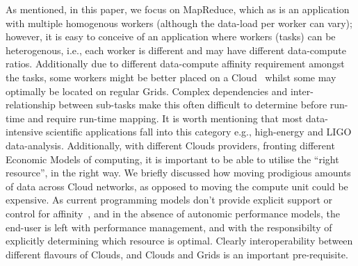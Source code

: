 \documentclass[conference,final]{IEEEtran}
\newcommand{\jhanote}[1]{ {\textcolor{red} { ***SJ: #1 }}}
\newcommand{\jhanote}[1]{}
\begin{document}

As mentioned, in this paper, we focus on MapReduce, which as is an
application with multiple homogenous workers (although the data-load
per worker can vary); however, it is easy to conceive of an
application where workers (tasks) can be heterogenous, i.e., each
worker is different and may have different data-compute ratios.
Additionally due to different data-compute affinity requirement
amongst the tasks, some workers might be better placed on a
Cloud~\cite{jha_ccpe09} whilst some may optimally be located on
regular Grids. 
Complex dependencies and inter-relationship between sub-tasks make
this often difficult to determine before run-time and require run-time
mapping. It is worth mentioning that most data-intensive scientific
applications fall into this category e.g., high-energy and LIGO
data-analysis.  Additionally, with different Clouds
providers, fronting different Economic Models of computing, it is
important to be able to utilise the ``right resource'', in the right
way. We briefly discussed how moving prodigious amounts of data across
Cloud networks, as opposed to moving the compute unit could be
expensive. %
As current programming models don't provide explicit support or
control for affinity~\cite{jha_ccpe09}, and in the absence of
autonomic performance models, the end-user is left with performance
management, and with the responsibilty of explicitly determining which
resource is optimal. Clearly interoperability between different
flavours of Clouds, and Clouds and Grids is an important
pre-requisite.

\end{document}

